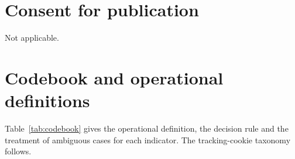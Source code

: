 \documentclass[]{interact}
\begin{document}
\section*{Consent for publication}
Not applicable.
\fi




\appendix

\renewcommand{\thetable}{\thesection\arabic{table}}
\renewcommand{\thefigure}{\thesection\arabic{figure}}

\section{Codebook and operational definitions}\label{ap:codebook}
\setcounter{table}{0}\setcounter{figure}{0}

Table~\ref{tab:codebook} gives the operational definition, the decision rule and the treatment of ambiguous cases for each indicator. The tracking-cookie taxonomy follows.
\end{document}
